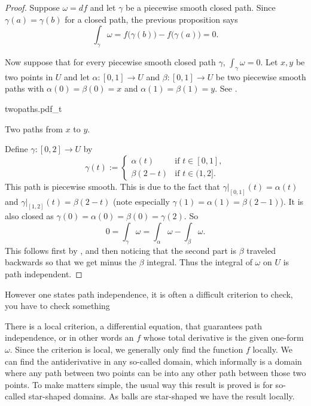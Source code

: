 \begin{proof}
Suppose $\omega = df$ and let $\gamma$ be a piecewise smooth
closed path.  
Since $\gamma(a) = \gamma(b)$ for a closed path,
the previous proposition says
\begin{equation*}
\int_{\gamma} \omega = f\bigl(\gamma(b)\bigr) - f\bigl(\gamma(a)\bigr) = 0 .
\end{equation*}

Now suppose that for every piecewise smooth closed path $\gamma$, $\int_{\gamma} \omega = 0$.
Let $x,y$ be two points in $U$ and let $\alpha \colon [0,1] \to U$ and
$\beta \colon [0,1] \to U$ be two piecewise smooth paths with $\alpha(0) = \beta(0) = x$
and $\alpha(1) = \beta(1) = y$.  See .
\begin{myfigureht}
{twopaths.pdf_t}
\caption{Two paths from $x$ to $y$.\label{fig:twopaths}}
\end{myfigureht}

Define $\gamma \colon [0,2] \to U$ by
\begin{equation*}
\gamma(t) :=
\begin{cases}
\alpha(t)  & \text{if } t \in [0,1], \\
\beta(2-t) & \text{if } t \in (1,2].
\end{cases}
\end{equation*}
This path is piecewise smooth.  This is due to the fact that
$\gamma|_{[0,1]}(t) = \alpha(t)$ and
$\gamma|_{[1,2]}(t) = \beta(2-t)$ (note especially $\gamma(1) = \alpha(1) =
\beta(2-1)$).
It is also closed as $\gamma(0) = \alpha(0) = \beta(0) = \gamma(2)$.
So 
\begin{equation*}
0 = \int_{\gamma} \omega = \int_{\alpha} \omega - \int_{\beta} \omega .
\end{equation*}
This follows first by , and then noticing that
the second part is $\beta$ traveled backwards so that we get minus the
$\beta$ integral.  Thus the integral of $\omega$ on $U$ is path independent.
\end{proof}

However one states path independence, it is often a difficult criterion to
check, you have to check something 

There is a local criterion, a differential equation, that guarantees
path independence, or in other words an
\emph{}
$f$ whose total derivative is the given one-form
$\omega$.  Since the criterion is local, we generally only find the
function $f$ 
locally.  We can find the antiderivative in any so-called
\emph{} domain, which informally is a domain where
any path between two points can be 
into any other path
between those two points.  To make matters simple, the usual way
this result is proved is for so-called star-shaped domains.
As balls are star-shaped we have the result locally.

